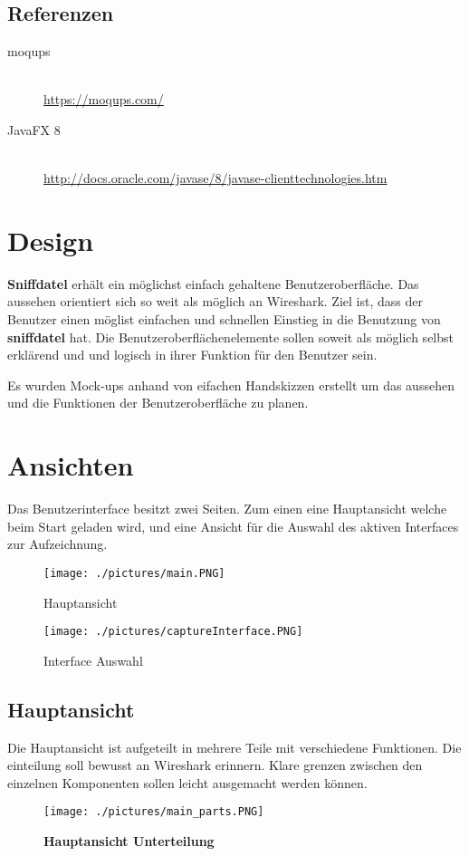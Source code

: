 \documentclass[a4,12pt]{scrartcl}
\begin{document}
\subsection{Referenzen}
\begin{description}
  \item[moqups] \hfill \\
  \url{https://moqups.com/}
  \item[JavaFX 8] \hfill \\
  \url{http://docs.oracle.com/javase/8/javase-clienttechnologies.htm}
\end{description}

\section{Design}
\textbf{Sniffdatel} erhält ein möglichst einfach gehaltene Benutzeroberfläche. Das aussehen orientiert sich so weit als möglich an Wireshark. Ziel ist, dass der Benutzer einen möglist einfachen und schnellen Einstieg in die Benutzung von \textbf{sniffdatel} hat. Die Benutzeroberflächenelemente sollen soweit als möglich selbst erklärend und und logisch in ihrer Funktion für den Benutzer sein.


Es wurden Mock-ups anhand von eifachen Handskizzen erstellt um das aussehen und die Funktionen der Benutzeroberfläche zu planen.
\section{Ansichten}
Das Benutzerinterface besitzt zwei Seiten. Zum einen eine Hauptansicht welche beim Start geladen wird, und eine Ansicht für die Auswahl des aktiven Interfaces zur Aufzeichnung.
\begin{figure} [H]
	\begin{center}
\begin{minipage}[hbt]{7cm}
	\centering
	\texttt{[image: ./pictures/main.PNG]}
	\caption{Hauptansicht}
	\label{Hauptansicht}
\end{minipage}
\hfill
\begin{minipage}[hbt]{7cm}
	\centering
	\texttt{[image: ./pictures/captureInterface.PNG]}
	\caption{Interface Auswahl}
	\label{Interface Auswahl}
\end{minipage}
	\end{center}
\end{figure}

\subsection{Hauptansicht}
Die Hauptansicht ist aufgeteilt in mehrere Teile mit verschiedene Funktionen. Die einteilung soll bewusst an Wireshark erinnern. Klare grenzen zwischen den einzelnen Komponenten sollen leicht ausgemacht werden können.  
\begin{figure} [H]
	\begin{center}
	\texttt{[image: ./pictures/main\_parts.PNG]}
	\caption{\textbf{Hauptansicht Unterteilung}}
	\label{Bild Referenz}
	\end{center}
\end{figure}
\end{document}
